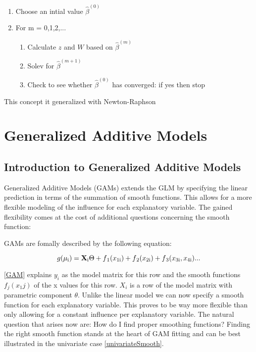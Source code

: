 \documentclass{article}
\begin{document}
    \begin{enumerate}
        \item Choose an intial value $\widehat{\beta} ^{(0)}$
        \item For m = 0,1,2,...
    \begin{enumerate}
     \item Calculate $z$ and $W$ based on $\widehat{\beta} ^{(m)}$
    \item Solev for $\widehat{\beta} ^{(m+1)}$
    \item Check to see whether $\widehat{\beta} ^{(0)}$ has converged: if yes then stop
  \end{enumerate}
\end{enumerate}

This concept it generalized with Newton-Raphson

    \section{Generalized Additive Models}
    \subsection{Introduction to Generalized Additive Models}
    Generalized Additive Models (GAMs) extends the GLM by specifying the linear prediction in terms of the summation of smooth functions. This allows for a more flexible modeling of the influence for each explanatory variable. The gained flexibility comes at the cost of additional questions concerning the smooth function:

    GAMs are fomally described by the following equation:

    \begin{equation} \label{GAM} g(\mu\textsubscript{i}) = \mathbf{X} \textsubscript{i} \Theta + f\textsubscript{1}(x\textsubscript{1i}) + f\textsubscript{2}(x\textsubscript{2i}) + f\textsubscript{3}(x\textsubscript{3i}, x\textsubscript{4i}) ... \end{equation}

    \ref{GAM} explains $y_i$ as the model matrix for this row and the smooth functions $f_j(x_1j)$ of the x values for this row. $X_i$ is a row of the model matrix with parametric component $\theta$. Unlike the linear model we can now  specify a smooth function for each explanatory variable. This proves to be way more flexible than only allowing for a constant influence per explanatory variable. The natural question that arises now are: How do I find proper smoothing functions? Finding the right smooth function stands at the heart of GAM fitting and can be best illustrated in the univariate case \ref{univariateSmooth}.
\end{document}
